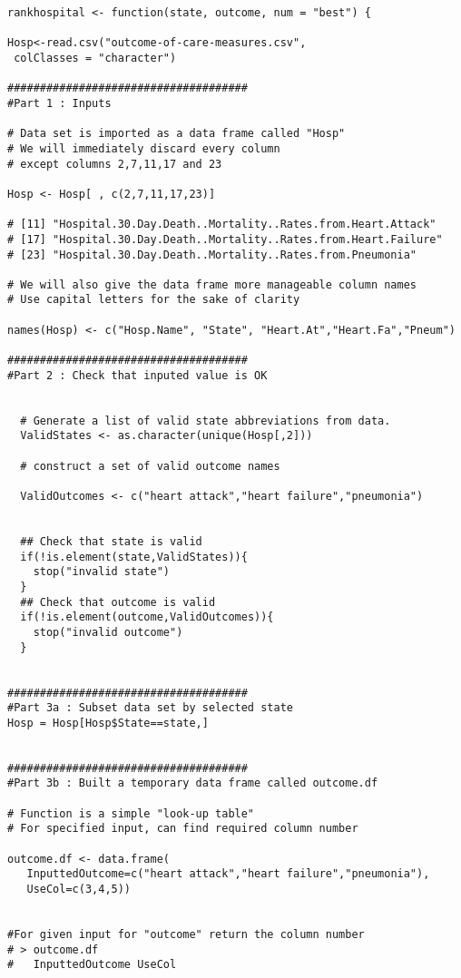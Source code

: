 \documentclass[]{article}
\begin{document}
\begin{framed}
\begin{verbatim}
rankhospital <- function(state, outcome, num = "best") {                            
     
Hosp<-read.csv("outcome-of-care-measures.csv",
 colClasses = "character")
 
#####################################
#Part 1 : Inputs

# Data set is imported as a data frame called "Hosp"
# We will immediately discard every column 
# except columns 2,7,11,17 and 23

Hosp <- Hosp[ , c(2,7,11,17,23)]

# [11] "Hospital.30.Day.Death..Mortality..Rates.from.Heart.Attack"                            
# [17] "Hospital.30.Day.Death..Mortality..Rates.from.Heart.Failure"                           
# [23] "Hospital.30.Day.Death..Mortality..Rates.from.Pneumonia"        

# We will also give the data frame more manageable column names
# Use capital letters for the sake of clarity

names(Hosp) <- c("Hosp.Name", "State", "Heart.At","Heart.Fa","Pneum")

#####################################
#Part 2 : Check that inputed value is OK


  # Generate a list of valid state abbreviations from data.
  ValidStates <- as.character(unique(Hosp[,2]))

  # construct a set of valid outcome names

  ValidOutcomes <- c("heart attack","heart failure","pneumonia")


  ## Check that state is valid
  if(!is.element(state,ValidStates)){
    stop("invalid state")
  }
  ## Check that outcome is valid
  if(!is.element(outcome,ValidOutcomes)){
    stop("invalid outcome")
  }


#####################################
#Part 3a : Subset data set by selected state
Hosp = Hosp[Hosp$State==state,]


#####################################
#Part 3b : Built a temporary data frame called outcome.df

# Function is a simple "look-up table"
# For specified input, can find required column number

outcome.df <- data.frame(
   InputtedOutcome=c("heart attack","heart failure","pneumonia"),
   UseCol=c(3,4,5))


#For given input for "outcome" return the column number 
# > outcome.df
#   InputtedOutcome UseCol


\end{verbatim}
\end{framed}
\end{document}
